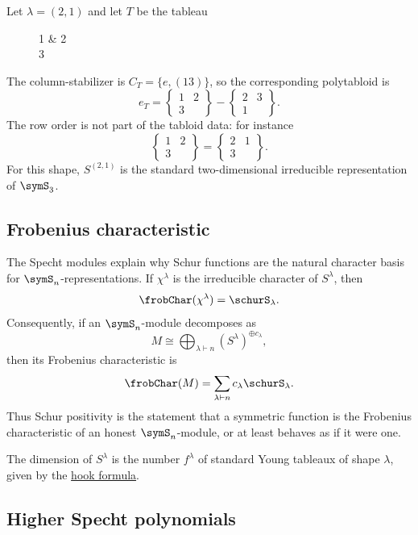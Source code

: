 \begin{example}
Let $\lambda=(2,1)$ and let $T$ be the tableau
\begin{figure}
\begin{ytableau}
1 & 2\\
3
\end{ytableau}
\end{figure}
The column-stabilizer is $C_T=\{e,(13)\}$, so the corresponding polytabloid is
\[
  e_T
  =
  \left\{\begin{array}{cc}
  1&2\\
  3
  \end{array}\right\}
  -
  \left\{\begin{array}{cc}
  2&3\\
  1
  \end{array}\right\}.
\]
The row order is not part of the tabloid data: for instance
\[
  \left\{\begin{array}{cc}1&2\\3\end{array}\right\}
  =
  \left\{\begin{array}{cc}2&1\\3\end{array}\right\}.
\]
For this shape, $S^{(2,1)}$ is the standard two-dimensional irreducible
representation of $\symS_3$.
\end{example}

\subsection[spechtFrobenius]{Frobenius characteristic}

The Specht modules explain why Schur functions are the natural character
basis for $\symS_n$-representations.  If $\chi^\lambda$ is the irreducible
character of $S^\lambda$, then
\[
  \frobChar(\chi^\lambda)=\schurS_\lambda.
\]
Consequently, if an $\symS_n$-module decomposes as
\[
  M \cong \bigoplus_{\lambda\vdash n}
  (S^\lambda)^{\oplus c_\lambda},
\]
then its Frobenius characteristic is
\[
  \frobChar(M)=\sum_{\lambda\vdash n} c_\lambda\schurS_\lambda.
\]
Thus Schur positivity is the statement that a symmetric function is the
Frobenius characteristic of an honest $\symS_n$-module, or at least behaves
as if it were one.

The dimension of $S^\lambda$ is the number $f^\lambda$ of standard Young
tableaux of shape $\lambda$, given by the
\hyperref[hookFormula]{hook formula}.

\subsection[higherSpechtPolynomials]{Higher Specht polynomials}

